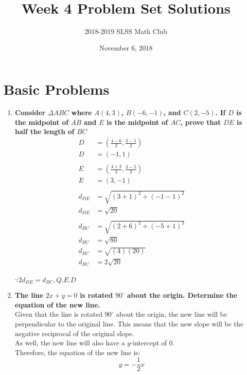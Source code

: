 \documentclass[12pt]{article}
\title{Week 4 Problem Set Solutions\vspace{-3mm}}
\author{2018-2019 SLSS Math Club\vspace{-5mm}}
\date{November 6, 2018 \vspace{-5mm}}
\begin{document}
\maketitle

\section*{Basic Problems}
\begin{enumerate}
    \item \textbf{Consider $\Delta ABC$ where $A(4, 3)$, $B(-6, -1)$, and $C(2, -5)$. If $D$ is the midpoint of $\overline{AB}$ and $E$ is the midpoint of $\overline{AC}$, prove that $\overline{DE}$ is half the length of $\overline{BC}$}
    \begin{align*}
        D&=(\frac{4-6}{2}, \frac{3-1}{2}) \\
        D&=(-1, 1) \\ \\
        E&=(\frac{4+2}{2}, \frac{3-5}{2}) \\
        E&=(3, -1) \\ \\
        d_{DE}&=\sqrt{(3+1)^2+(-1-1)^2} \\
        d_{DE}&=\sqrt{20} \\ \\
        d_{BC}&=\sqrt{(2+6)^2+(-5+1)^2} \\
        d_{BC}&=\sqrt{80} \\ 
        d_{BC}&=\sqrt{(4)(20)} \\
        d_{BC}&=2\sqrt{20} \\ 
    \end{align*}
    
    $\because 2d_{DE} = d_{BC}, Q.E.D$
    
    \item \textbf{The line $2x + y = 0$ is rotated $90^{\circ}$ about the origin. Determine the equation of the new line.} \\
    
    Given that the line is rotated $90^{\circ}$ about the origin, the new line will be perpendicular to the original line. This means that the new slope will be the negative reciprocal of the original slope. \\
    
    As well, the new line will also have a $y$-intercept of $0$. \\
    
    Therefore, the equation of the new line is:
    \begin{equation*}
        y = -\frac{1}{2}x
    \end{equation*}
\end{enumerate} \newpage
\end{document}
